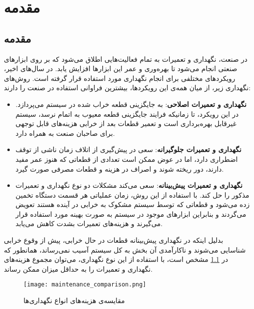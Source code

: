 \chapter{مقدمه}

\section{مقدمه}
در صنعت، نگهداری و تعمیرات به تمام فعالیت‌هایی اطلاق می‌شود که بر روی ابزارهای صنعتی انجام می‌شود تا بهره‌وری و عمر این ابزارها افزایش یابد. در سال‌های اخیر، رویکردهای مختلفی برای انجام نگهداری مورد استفاده قرار گرفته است. روش‌های نگهداری زیر، از میان همه‌ی این رویکردها، بیشترین فراوانی استفاده در صنعت را دارند\cite{zhao2022review}:

\begin{itemize}

\item \textbf{نگهداری و تعمیرات اصلاحی}: به جایگزینی قطعه خراب شده در سیستم می‌پردازد. در این رویکرد، تا زمانیکه فرایند جایگزینی قطعه معیوب به اتمام نرسد، سیستم غیرقابل بهره‌برداری است و تعمیر قطعات بعد از خرابی هزینه‌های قابل توجهی برای صاحبان صنعت به همراه دارد.

\item \textbf{نگهداری و تعمیرات جلو‌گیرانه}: سعی در پیش‌گیری از اتلاف زمان ناشی از توقف اضطراری دارد، اما در عوض ممکن است تعدادی از قطعاتی که هنوز عمر مفید دارند، دور ریخته شوند و اصراف در هزینه و قطعات مصرفی صورت گیرد.

\item \textbf{نگهداری و تعمیرات پیش‌بینانه}: سعی می‌کند مشکلات دو نوع نگهداری و تعمیرات مذکور را حل کند. با استفاده از این روش، زمان عملیاتی هر قسمت دستگاه تخمین زده می‌شود و قطعاتی که توسط سیستم مشکوک به خرابی در آینده هستند تعویض می‌گردند و بنابراین ابزارهای موجود در سیستم به صورت بهینه مورد استفاده قرار می‌گیرند و هزینه‌های تعمیرات بشدت کاهش می‌یابد.

\end{itemize}

بدلیل اینکه در نگهداری پیش‌بینانه قطعات در حال خرابی، پیش از وقوع خرابی شناسایی می‌شوند و ناکارآمدی آن بخش به کل سیستم آسیب نمی‌رساند، همانطور که در \cref{fig:maintenance_comparison} مشخص است، با استفاده از این نوع نگهداری، می‌توان مجموع هزینه‌های نگهداری و تعمیرات را به حداقل میزان ممکن رساند.

\begin{figure}[!h]
\centerline{\texttt{[image: maintenance\_comparison.png]}}
\caption{مقایسه‌ی هزینه‌های انواع نگهد‌اری‌ها}
\label{fig:maintenance_comparison}
\end{figure}


